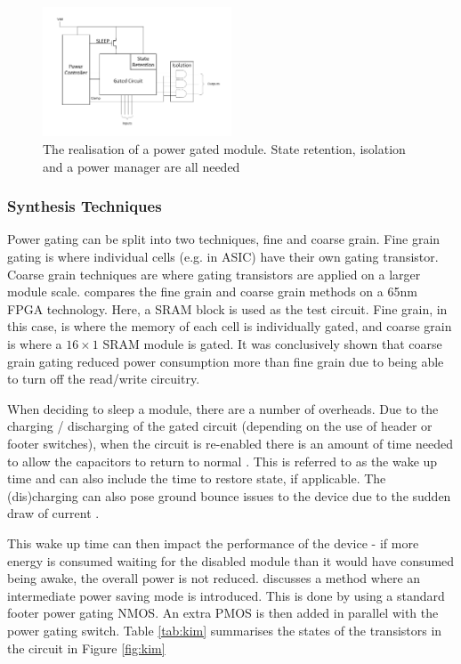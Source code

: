 \begin{figure}
\includegraphics[width=0.5\textwidth]{Figures/powergating_full.pdf}
\caption{The realisation of a power gated module. State retention, isolation and a power manager are all needed}
\label{fig:powergated}
\end{figure}


\subsubsection{Synthesis Techniques}

Power gating can be split into two techniques, fine and coarse grain.
Fine grain gating is where individual cells (e.g. in ASIC) have their own gating transistor. 
Coarse grain techniques are where gating transistors are applied on a larger module scale.
\cite{nair2009comparative} compares the fine grain and coarse grain methods on a 65nm FPGA technology. 
Here, a SRAM block is used as the test circuit. 
Fine grain, in this case, is where the memory of each cell is individually gated, and coarse grain is where a $16 \times 1$ SRAM module is gated. 
It was conclusively shown that coarse grain gating reduced power consumption more than fine grain due to being able to turn off the read/write circuitry. 


When deciding to sleep a module, there are a number of overheads.
Due to the charging / discharging of the gated circuit (depending on the use of header or footer switches), when the circuit is re-enabled there is an amount of time needed to allow the capacitors to return to normal \cite{abdollahi2005effective}.
This is referred to as the wake up time and can also include the time to restore state, if applicable.
The (dis)charging can also pose ground bounce issues to the device due to the sudden draw of current \cite{kim2003understanding,chang1997analysis}. 

This wake up time can then impact the performance of the device - if more energy is consumed waiting for the disabled module than it would have consumed being awake, the overall power is not reduced.
\cite{kim2004experimental} discusses a method where an intermediate power saving mode is introduced.
This is done by using a standard footer power gating NMOS. 
An extra PMOS is then added in parallel with the power gating switch. 
Table \ref{tab:kim} summarises the states of the transistors in the circuit in Figure \ref{fig:kim}

